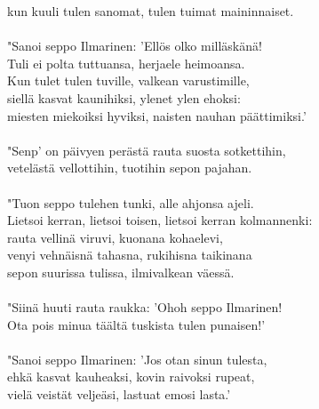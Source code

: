 kun kuuli tulen sanomat, tulen tuimat maininnaiset.                    \\
                                                                       \\
"Sanoi seppo Ilmarinen: 'Ellös olko milläskänä!                        \\
Tuli ei polta tuttuansa, herjaele heimoansa.                           \\
Kun tulet tulen tuville, valkean varustimille,                         \\
siellä kasvat kaunihiksi, ylenet ylen ehoksi:                          \\
miesten miekoiksi hyviksi, naisten nauhan päättimiksi.'                \\
                                                                       \\
"Senp' on päivyen perästä rauta suosta sotkettihin,                    \\
vetelästä vellottihin, tuotihin sepon pajahan.                         \\
                                                                       \\
"Tuon seppo tulehen tunki, alle ahjonsa ajeli.                         \\
Lietsoi kerran, lietsoi toisen, lietsoi kerran kolmannenki:            \\
rauta vellinä viruvi, kuonana kohaelevi,                               \\
venyi vehnäisnä tahasna, rukihisna taikinana                           \\
sepon suurissa tulissa, ilmivalkean väessä.                            \\
                                                                       \\
"Siinä huuti rauta raukka: 'Ohoh seppo Ilmarinen!                      \\
Ota pois minua täältä tuskista tulen punaisen!'                        \\
                                                                       \\
"Sanoi seppo Ilmarinen: 'Jos otan sinun tulesta,                       \\
ehkä kasvat kauheaksi, kovin raivoksi rupeat,                          \\
vielä veistät veljeäsi, lastuat emosi lasta.'                          \\
